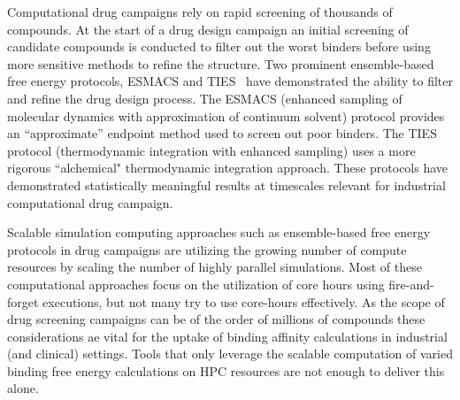 
Computational drug campaigns rely on rapid screening of thousands of compounds. 
At the start of a drug design campaign an initial screening of candidate 
compounds is conducted to filter out the worst binders before using more 
sensitive methods to refine the structure. 
Two prominent ensemble-based free energy protocols, ESMACS and TIES~\cite{Bhati2017} 
have demonstrated the ability to filter and refine the drug design process. 
The ESMACS (enhanced sampling of molecular dynamics with approximation of continuum 
solvent) protocol provides an ``approximate'' endpoint method used to screen out 
poor binders. 
The TIES protocol (thermodynamic integration with enhanced sampling) uses a more 
rigorous ``alchemical" thermodynamic integration approach. 
These protocols have demonstrated statistically meaningful results at timescales 
relevant for industrial computational drug campaign. 


Scalable simulation computing approaches such as ensemble-based free energy 
protocols in drug campaigns are utilizing the growing number of compute 
resources by scaling the number of highly parallel simulations. 
Most of these computational approaches focus on the utilization of core hours 
using fire-and-forget executions, but not many try to use core-hours effectively. 
As the scope of drug screening campaigns can be of the order of millions of compounds 
these considerations ae vital for the uptake of binding affinity calculations in 
industrial (and clinical) settings.
Tools that only leverage the scalable computation of varied binding free energy 
calculations on HPC resources are not enough to deliver this alone.




